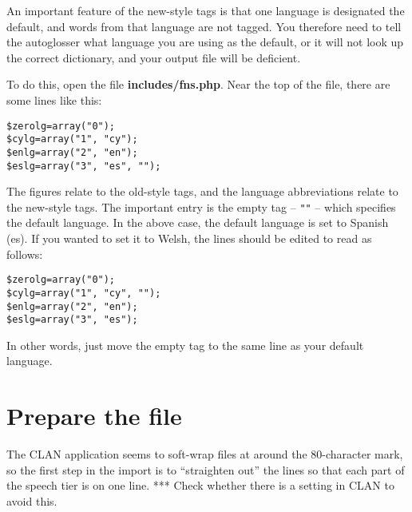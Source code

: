 \documentclass[a4paper,10pt]{article}
\begin{document}
An important feature of the new-style tags is that one language is designated the default, and words from that language are not tagged.  You therefore need to tell the autoglosser what language you are using as the default, or it will not look up the correct dictionary, and your output file will be deficient.

To do this, open the file \textbf{includes/fns.php}.  Near the top of the file, there are some lines like this:
\begin{verbatim}
$zerolg=array("0");
$cylg=array("1", "cy");
$enlg=array("2", "en");
$eslg=array("3", "es", "");
\end{verbatim}
The figures relate to the old-style tags, and the language abbreviations relate to the new-style tags.  The important entry is the empty tag -- \verb|""| -- which specifies the default language.  In the above case, the default language is set to Spanish (es).  If you wanted to set it to Welsh, the lines should be edited to read as follows:
\begin{verbatim}
$zerolg=array("0");
$cylg=array("1", "cy", "");
$enlg=array("2", "en");
$eslg=array("3", "es");
\end{verbatim}
In other words, just move the empty tag to the same line as your default language.


\section{Prepare the file}
\label{sec:prepare}

The CLAN application seems to soft-wrap files at around the 80-character mark, so the first step in the import is to ``straighten out'' the lines so that each part of the speech tier is on one line.  *** Check whether there is a setting in CLAN to avoid this.
\end{document}
